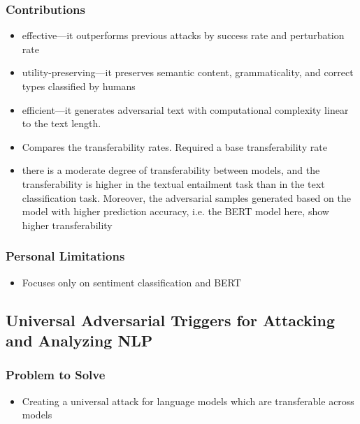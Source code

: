 \documentclass{article}
\begin{document}
\begin{flushleft}
\subsubsection*{Contributions}
\begin{itemize}
  \item effective—it outperforms previous attacks by success rate and perturbation rate
    \item utility-preserving—it preserves semantic content, grammaticality, and correct types classified by humans
  \item efficient—it generates adversarial text with computational complexity linear to the text length.
  \item Compares the transferability rates. Required a base transferability rate
  \item there is a moderate degree of transferability between models, and the transferability is higher in the textual entailment task than in the text classification task. Moreover, the adversarial samples generated based on the model with higher prediction accuracy, i.e. the BERT model here, show higher transferability
\end{itemize}


\subsubsection*{Personal Limitations}
\begin{itemize}
    \item Focuses only on sentiment classification and BERT
\end{itemize}







\subsection{Universal Adversarial Triggers for Attacking and Analyzing NLP \cite{wallace2019universal} }

\subsubsection*{Problem to Solve}
\begin{itemize}
    \item Creating a universal attack for language models which are transferable across models
\end{itemize}


\end{flushleft}
\end{document}
